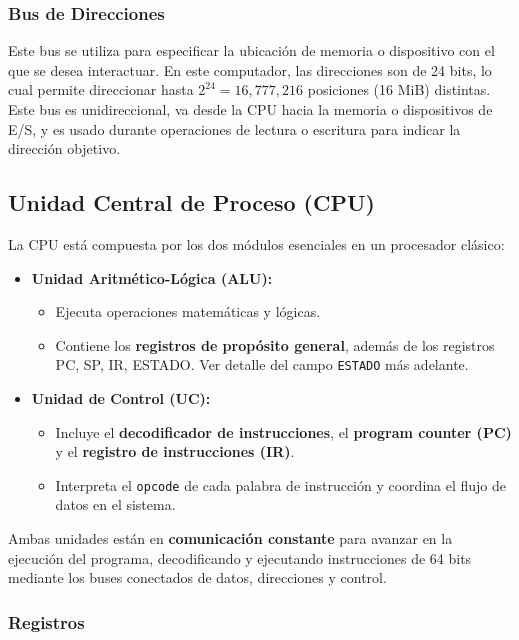 \documentclass{article}
\begin{document}
\subsubsection*{Bus de Direcciones}

Este bus se utiliza para especificar la ubicación de memoria o
dispositivo con el que se desea interactuar. En este computador, las
direcciones son de 24 bits, lo cual permite direccionar hasta
$2^{24} = 16,\!777,\!216$ posiciones (16 MiB) distintas.
Este bus es unidireccional, va desde la CPU hacia la memoria o
dispositivos de E/S, y es usado durante operaciones de lectura o
escritura para indicar la dirección objetivo.


\subsection{Unidad Central de Proceso (CPU)}

La CPU está compuesta por los dos módulos esenciales en un procesador clásico:

\begin{itemize}
  \item \textbf{Unidad Aritmético-Lógica (ALU):}
        \begin{itemize}
          \item Ejecuta operaciones matemáticas y lógicas.
          \item Contiene los \textbf{registros de propósito general}, además de los registros PC, SP, IR, ESTADO. Ver detalle del campo \texttt{ESTADO} más adelante.
        \end{itemize}
  \item \textbf{Unidad de Control (UC):}
        \begin{itemize}
          \item Incluye el \textbf{decodificador de instrucciones}, el \textbf{program counter (PC)} y el \textbf{registro de instrucciones (IR)}.
          \item Interpreta el \texttt{opcode} de cada palabra de instrucción y coordina el flujo de datos en el sistema.
        \end{itemize}
\end{itemize}

Ambas unidades están en \textbf{comunicación constante} para avanzar en la ejecución del programa, decodificando y ejecutando instrucciones de 64 bits mediante los buses conectados de datos, direcciones y control.

\subsubsection{Registros}
\end{document}
